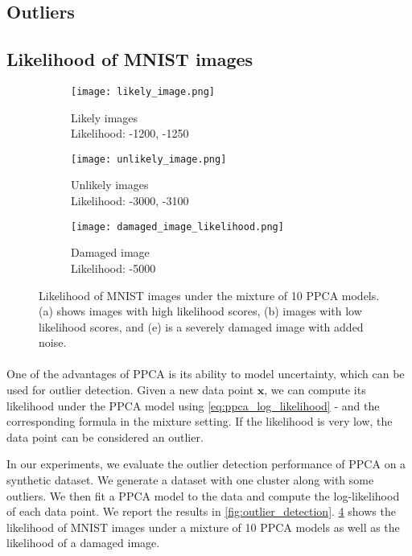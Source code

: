 \documentclass{article}
\begin{document}
\subsection{Outliers}

\subsection{Likelihood of MNIST images}

\begin{figure}[H]
    \centering
    \begin{subfigure}[b]{0.1\textwidth}
        \centering
        \texttt{[image: likely\_image.png]}
        \caption{Likely images \\ Likelihood: -1200, -1250}
        \label{fig:likely_image_1}
    \end{subfigure}
    \hfill
    \begin{subfigure}[b]{0.1\textwidth}
        \centering
        \texttt{[image: unlikely\_image.png]}
        \caption{Unlikely images \\ Likelihood: -3000, -3100}
        \label{fig:unlikely_image_1}
    \end{subfigure}
    \hfill
    \begin{subfigure}[b]{0.1\textwidth}
        \centering
        \texttt{[image: damaged\_image\_likelihood.png]}
        \caption{Damaged image \\ Likelihood: -5000}
        \label{fig:damaged_image_likelihood}
    \end{subfigure}
    \caption{Likelihood of MNIST images under the mixture of 10 PPCA models. (a) shows images with high likelihood scores, (b) images with low likelihood scores, and (e) is a severely damaged image with added noise.}
    \label{fig:mnist_likelihood}
\end{figure}

\paragraph{} One of the advantages of PPCA is its ability to model uncertainty, which can be used for outlier detection. Given a new data point $\mathbf{x}$, we can compute its likelihood under the PPCA model using \cref{eq:ppca_log_likelihood} - and the corresponding formula in the mixture setting. If the likelihood is very low, the data point can be considered an outlier.

In our experiments, we evaluate the outlier detection performance of PPCA on a synthetic dataset. We generate a dataset with one cluster along with some outliers. We then fit a PPCA model to the data and compute the log-likelihood of each data point. We report the results in \cref{fig:outlier_detection}. \cref{fig:mnist_likelihood} shows the likelihood of MNIST images under a mixture of 10 PPCA models as well as the likelihood of a damaged image.
\end{document}
